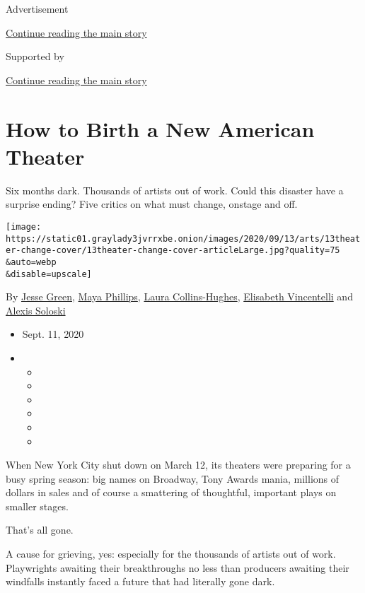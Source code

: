 Advertisement

\protect\hyperlink{after-top}{Continue reading the main story}

Supported by

\protect\hyperlink{after-sponsor}{Continue reading the main story}

\hypertarget{how-to-birth-a-new-american-theater}{%
\section{How to Birth a New American
Theater}\label{how-to-birth-a-new-american-theater}}

Six months dark. Thousands of artists out of work. Could this disaster
have a surprise ending? Five critics on what must change, onstage and
off.

\texttt{[image: https://static01.graylady3jvrrxbe.onion/images/2020/09/13/arts/13theater-change-cover/13theater-change-cover-articleLarge.jpg?quality=75\\\&auto=webp\\\&disable=upscale]}

By \href{https://www.nytimes3xbfgragh.onion/by/jesse-green}{Jesse
Green}, \href{https://www.nytimes3xbfgragh.onion/by/maya-phillips}{Maya
Phillips},
\href{https://www.nytimes3xbfgragh.onion/by/laura-collins-hughes}{Laura
Collins-Hughes},
\href{https://www.nytimes3xbfgragh.onion/by/elisabeth-vincentelli}{Elisabeth
Vincentelli} and
\href{https://www.nytimes3xbfgragh.onion/by/alexis-soloski}{Alexis
Soloski}

\begin{itemize}
\item
  Sept. 11, 2020
\item
  \begin{itemize}
  \item
  \item
  \item
  \item
  \item
  \item
  \end{itemize}
\end{itemize}

When New York City shut down on March 12, its theaters were preparing
for a busy spring season: big names on Broadway, Tony Awards mania,
millions of dollars in sales and of course a smattering of thoughtful,
important plays on smaller stages.

That's all gone.

A cause for grieving, yes: especially for the thousands of artists out
of work. Playwrights awaiting their breakthroughs no less than producers
awaiting their windfalls instantly faced a future that had literally
gone dark.

